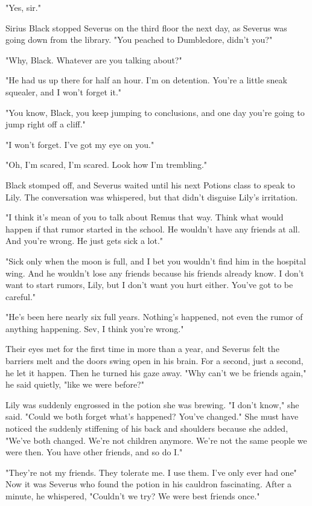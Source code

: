"Yes, sir."

Sirius Black stopped Severus on the third floor the next day, as Severus was going down from the library. "You peached to Dumbledore, didn't you?"

"Why, Black. Whatever are you talking about?"

"He had us up there for half an hour. I'm on detention. You're a little sneak squealer, and I won't forget it."

"You know, Black, you keep jumping to conclusions, and one day you're going to jump right off a cliff."

"I won't forget. I've got my eye on you."

"Oh, I'm scared, I'm scared. Look how I'm trembling."

Black stomped off, and Severus waited until his next Potions class to speak to Lily. The conversation was whispered, but that didn't disguise Lily's irritation.

"I think it's mean of you to talk about Remus that way. Think what would happen if that rumor started in the school. He wouldn't have any friends at all. And you're wrong. He just gets sick a lot."

"Sick only when the moon is full, and I bet you wouldn't find him in the hospital wing. And he wouldn't lose any friends because his friends already know. I don't want to start rumors, Lily, but I don't want you hurt either. You've got to be careful."

"He's been here nearly six full years. Nothing's happened, not even the rumor of anything happening. Sev, I think you're wrong."

Their eyes met for the first time in more than a year, and Severus felt the barriers melt and the doors swing open in his brain. For a second, just a second, he let it happen. Then he turned his gaze away. "Why can't we be friends again," he said quietly, "like we were before?"

Lily was suddenly engrossed in the potion she was brewing. "I don't know," she said. "Could we both forget what's happened? You've changed." She must have noticed the suddenly stiffening of his back and shoulders because she added, "We've both changed. We're not children anymore. We're not the same people we were then. You have other{\el} friends, and so do I."

"They're not my friends. They tolerate me. I use them. I've only ever had one{\el}" Now it was Severus who found the potion in his cauldron fascinating. After a minute, he whispered, "Couldn't we try? We were best friends once."

